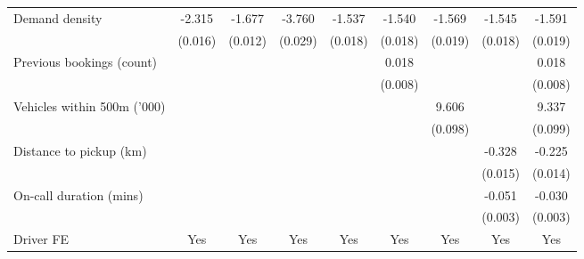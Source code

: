\documentclass[reviewmode]{restat}
\begin{document}
\begin{appendices}
\begin{table}[h]
{\begin{minipage}{18cm}
{\begin{tabular}{l*{8}{c}}
				\addlinespace
				Demand density      &      -2.315\sym{***}&      -1.677\sym{***}&      -3.760\sym{***}&      -1.537\sym{***}&      -1.540\sym{***}&      -1.569\sym{***}&      -1.545\sym{***}&      -1.591\sym{***}\\
				                    &     (0.016)         &     (0.012)         &     (0.029)         &     (0.018)         &     (0.018)         &     (0.019)         &     (0.018)         &     (0.019)         \\
				\addlinespace
				Previous bookings (count)&                     &                     &                     &                     &       0.018\sym{**} &                     &                     &       0.018\sym{**} \\
				                    &                     &                     &                     &                     &     (0.008)         &                     &                     &     (0.008)         \\
				\addlinespace
				Vehicles within 500m ('000)&                     &                     &                     &                     &                     &       9.606\sym{***}&                     &       9.337\sym{***}\\
				                    &                     &                     &                     &                     &                     &     (0.098)         &                     &     (0.099)         \\
				\addlinespace
				Distance to pickup (km)&                     &                     &                     &                     &                     &                     &      -0.328\sym{***}&      -0.225\sym{***}\\
				                    &                     &                     &                     &                     &                     &                     &     (0.015)         &     (0.014)         \\
				\addlinespace
				On-call duration (mins)&                     &                     &                     &                     &                     &                     &      -0.051\sym{***}&      -0.030\sym{***}\\
				                    &                     &                     &                     &                     &                     &                     &     (0.003)         &     (0.003)         \\
				\addlinespace
				Driver FE           &       {Yes}         &       {Yes}         &       {Yes}         &       {Yes}         &       {Yes}         &       {Yes}         &       {Yes}         &       {Yes}         \\

\end{tabular}}
\end{minipage}}
\end{table}
\end{appendices}
\end{document}
